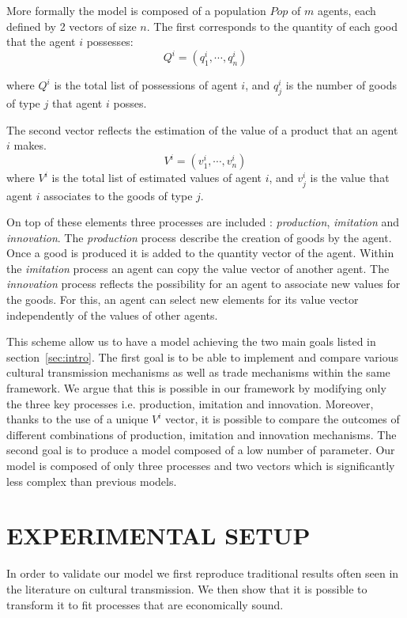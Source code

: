 \documentclass{wscpaperproc}
\begin{document}
More formally the model is composed of a population $Pop$ of $m$ agents, each defined by 2 vectors of size $n$. The first corresponds to the quantity of each good that the agent $i$ possesses: $$ Q^i = (q^i_1,\cdots,q^i_n) $$

where $Q^i$ is the total list of possessions of agent $i$, and $q^i_j$ is the number of goods of type $j$ that agent $i$ posses.

The second vector reflects the estimation of the value of a product that an agent $i$ makes.
$$ V^i = (v^i_1,\cdots,v^i_n) $$
where $V^i$ is the total list of estimated values of agent $i$, and $v^i_j$ is the value that agent $i$ associates to the goods of type $j$.

On top of these elements three processes are included : \textit{production}, \textit{imitation} and \textit{innovation}. The \textit{production} process describe the creation of goods by the agent. Once a good is produced it is added to the quantity vector of the agent. Within the \textit{imitation} process an agent can copy the value vector of another agent. The \textit{innovation} process reflects the possibility for an agent to associate new values for the goods. For this, an agent can select new elements for its value vector independently of the values of other agents. 

This scheme allow us to have a model achieving the two main goals listed in section~\ref{sec:intro}. The first goal is to be able to implement and compare various cultural transmission mechanisms as well as trade mechanisms within the same framework. We argue that this is possible in our framework by modifying only the three key processes i.e. production, imitation and innovation. Moreover, thanks to the use of a unique $V^i$ vector, it is possible to compare the outcomes of different combinations of production, imitation and innovation mechanisms. The second goal is to produce a model composed of a low number of parameter. Our model is composed of only three processes and two vectors which is significantly less complex than previous models.


\section{EXPERIMENTAL SETUP}


In order to validate our model we first reproduce traditional results often seen in the literature on cultural transmission. We then show that it is possible to transform it to fit processes that are economically sound.
\end{document}
